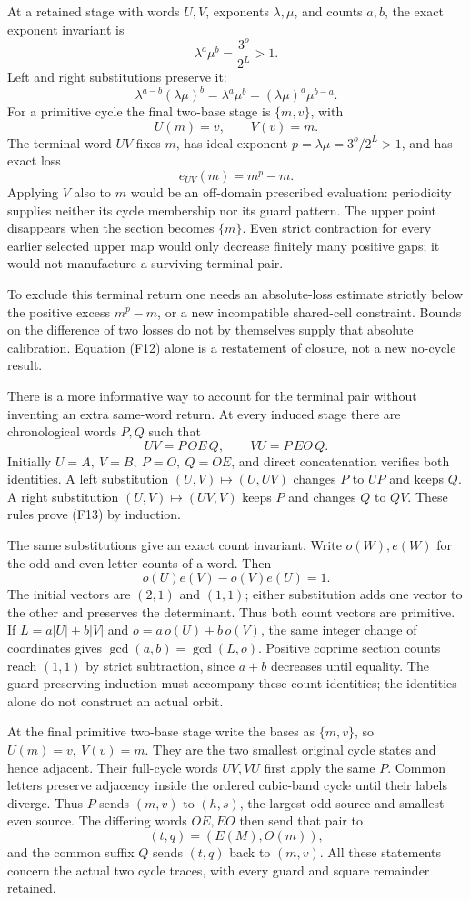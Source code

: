 \documentclass[12pt]{article}
\begin{document}
At a retained stage with words \(U,V\), exponents \(\lambda,\mu\), and
counts \(a,b\), the exact exponent invariant is \[
\lambda^a\mu^b=\frac{3^o}{2^L}>1.
\] Left and right substitutions preserve it: \[
\lambda^{a-b}(\lambda\mu)^b
=\lambda^a\mu^b
=(\lambda\mu)^a\mu^{b-a}.
\] For a primitive cycle the final two-base stage is \(\{m,v\}\), with
\[
U(m)=v,\qquad V(v)=m.
\] The terminal word \(UV\) fixes \(m\), has ideal exponent
\(p=\lambda\mu=3^o/2^L>1\), and has exact loss \[
e_{UV}(m)=m^p-m.
\tag{F12}
\] Applying \(V\) also to \(m\) would be an off-domain prescribed
evaluation: periodicity supplies neither its cycle membership nor its
guard pattern. The upper point disappears when the section becomes
\(\{m\}\). Even strict contraction for every earlier selected upper map
would only decrease finitely many positive gaps; it would not
manufacture a surviving terminal pair.

To exclude this terminal return one needs an absolute-loss estimate
strictly below the positive excess \(m^p-m\), or a new incompatible
shared-cell constraint. Bounds on the difference of two losses do not by
themselves supply that absolute calibration. Equation (F12) alone is a
restatement of closure, not a new no-cycle result.

There is a more informative way to account for the terminal pair without
inventing an extra same-word return. At every induced stage there are
chronological words \(P,Q\) such that \[
UV=P\,OE\,Q,\qquad VU=P\,EO\,Q.
\tag{F13}
\] Initially \(U=A,\ V=B,\ P=O,\ Q=OE\), and direct concatenation
verifies both identities. A left substitution \((U,V)\mapsto(U,UV)\)
changes \(P\) to \(UP\) and keeps \(Q\). A right substitution
\((U,V)\mapsto(UV,V)\) keeps \(P\) and changes \(Q\) to \(QV\). These
rules prove (F13) by induction.

The same substitutions give an exact count invariant. Write
\(o(W),e(W)\) for the odd and even letter counts of a word. Then \[
o(U)e(V)-o(V)e(U)=1.
\] The initial vectors are \((2,1)\) and \((1,1)\); either substitution
adds one vector to the other and preserves the determinant. Thus both
count vectors are primitive. If \(L=a|U|+b|V|\) and
\(o=a\,o(U)+b\,o(V)\), the same integer change of coordinates gives
\(\gcd(a,b)=\gcd(L,o)\). Positive coprime section counts reach \((1,1)\)
by strict subtraction, since \(a+b\) decreases until equality. The
guard-preserving induction must accompany these count identities; the
identities alone do not construct an actual orbit.

At the final primitive two-base stage write the bases as \(\{m,v\}\), so
\(U(m)=v,\ V(v)=m\). They are the two smallest original cycle states and
hence adjacent. Their full-cycle words \(UV,VU\) first apply the same
\(P\). Common letters preserve adjacency inside the ordered cubic-band
cycle until their labels diverge. Thus \(P\) sends \((m,v)\) to
\((h,s)\), the largest odd source and smallest even source. The
differing words \(OE,EO\) then send that pair to \[
(t,q)=(E(M),O(m)),
\] and the common suffix \(Q\) sends \((t,q)\) back to \((m,v)\). All
these statements concern the actual two cycle traces, with every guard
and square remainder retained.
\end{document}
